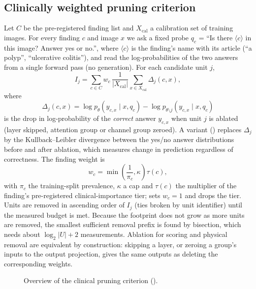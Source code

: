 \subsection{Clinically weighted pruning criterion}
Let $C$ be the pre-registered finding list and $X_{\mathrm{cal}}$ a calibration set
of training images. For every finding $c$ and image $x$ we ask a fixed probe
$q_c$ = ``Is there $\langle c \rangle$ in this image? Answer yes or no.'', where
$\langle c \rangle$ is the finding's name with its article (``a polyp'', ``ulcerative
colitis''), and read
the log-probabilities of the two answers from a single forward pass (no
generation). For each candidate unit $j$,
\begin{equation}
  I_j = \sum_{c \in C} w_c \, \frac{1}{|X_{\mathrm{cal}}|} \sum_{x \in X_{\mathrm{cal}}} \Delta_j(c, x),
  \label{eq:importance}
\end{equation}
where
\begin{equation}
  \Delta_j(c, x) = \log p_\theta(y_{c,x} \mid x, q_c) - \log p_{\theta \setminus j}(y_{c,x} \mid x, q_c)
\end{equation}
is the drop in log-probability of the \emph{correct} answer $y_{c,x}$ when unit $j$
is ablated (layer skipped, attention group or channel group zeroed). A variant
() replaces $\Delta_j$ by the Kullback--Leibler divergence between the
yes/no answer distributions before and after ablation, which measures change in
prediction regardless of correctness. The finding weight is
\begin{equation}
  w_c = \min\!\left(\frac{1}{\pi_c}, \kappa\right) \tau(c),
\end{equation}
with $\pi_c$ the training-split prevalence, $\kappa$ a cap and $\tau(c)$ the
multiplier of the finding's pre-registered clinical-importance tier; 
sets $w_c = 1$ and  drops the tier. Units are removed in ascending order
of $I_j$ (ties broken by unit identifier) until the measured budget is met. Because
the footprint does not grow as more units are removed, the smallest sufficient
removal prefix is found by bisection, which needs about $\log_2 |U| + 2$
measurements. Ablation for scoring and physical removal are equivalent by
construction: skipping a layer, or zeroing a group's inputs to the output
projection, gives the same outputs as deleting the corresponding weights.

\begin{figure}[t]
  \centering
  \caption{Overview of the clinical pruning criterion ().}
  \label{fig:method}
\end{figure}


